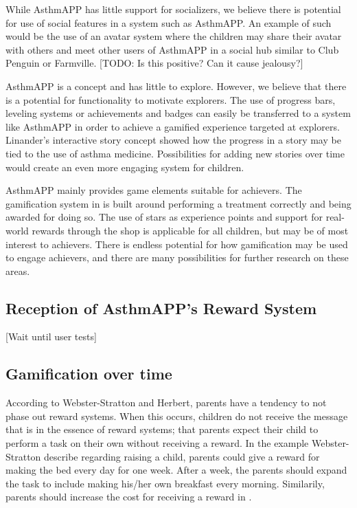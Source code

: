 While AsthmAPP has little support for socializers, we believe there is potential for use of social features in a system such as AsthmAPP. An example of such would be the use of an avatar system where the children may share their avatar with others and meet other users of AsthmAPP in a social hub similar to Club Penguin or Farmville. 
[TODO: Is this positive? Can it cause jealousy?]

AsthmAPP is a concept and has little to explore. However, we believe that there is a potential for functionality to motivate explorers. The use of progress bars, leveling systems or achievements and badges can easily be transferred to a system like AsthmAPP in order to achieve a gamified experience targeted at explorers. Linander's interactive story concept showed how the progress in a story may be tied to the use of asthma medicine\cite{linander2013utvikling}. Possibilities for adding new stories over time would create an even more engaging system for children. 

AsthmAPP mainly provides game elements suitable for achievers. The gamification system in \app{} is built around performing a treatment correctly and being awarded for doing so. The use of stars as experience points and support for real-world rewards through the shop is applicable for all children, but may be of most interest to achievers. There is endless potential for how gamification may be used to engage achievers, and there are many possibilities for further research on these areas. 


\subsection{Reception of AsthmAPP's Reward System}
[Wait until user tests]


\subsection{Gamification over time}
\label{sec:gamificationovertime}
According to Webster-Stratton and Herbert, parents have a tendency to not phase out reward systems\cite{webster1994troubled}. When this occurs, children do not receive the message that is in the essence of reward systems; that parents expect their child to perform a task on their own without receiving a reward. In the example Webster-Stratton \etal{} describe regarding raising a child, parents could give a reward for making the bed every day for one week. After a week, the parents should expand the task to include making his/her own breakfast every morning. Similarily, parents should increase the cost for receiving a reward in \app{}.  

